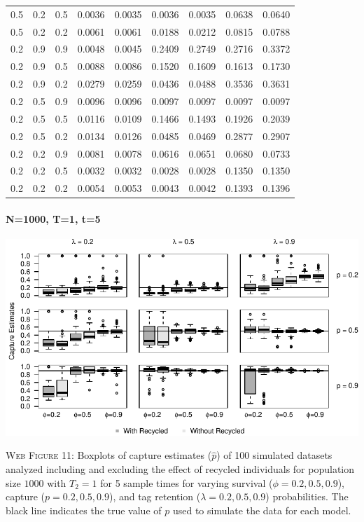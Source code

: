 \documentclass[]{article}
\let\oldparagraph\paragraph
\renewcommand{\paragraph}[1]{\oldparagraph{#1}\mbox{}}
\begin{document}
\begin{table}[ht]
{\begin{tabular}{rrrrrrrrr}
  0.5 & 0.2 & 0.5 & 0.0036 & 0.0035 & 0.0036 & 0.0035 & 0.0638 & 0.0640 \\ 
  0.5 & 0.2 & 0.2 & 0.0061 & 0.0061 & 0.0188 & 0.0212 & 0.0815 & 0.0788 \\ 
  0.2 & 0.9 & 0.9 & 0.0048 & 0.0045 & 0.2409 & 0.2749 & 0.2716 & 0.3372 \\ 
  0.2 & 0.9 & 0.5 & 0.0088 & 0.0086 & 0.1520 & 0.1609 & 0.1613 & 0.1730 \\ 
  0.2 & 0.9 & 0.2 & 0.0279 & 0.0259 & 0.0436 & 0.0488 & 0.3536 & 0.3631 \\ 
  0.2 & 0.5 & 0.9 & 0.0096 & 0.0096 & 0.0097 & 0.0097 & 0.0097 & 0.0097 \\ 
  0.2 & 0.5 & 0.5 & 0.0116 & 0.0109 & 0.1466 & 0.1493 & 0.1926 & 0.2039 \\ 
  0.2 & 0.5 & 0.2 & 0.0134 & 0.0126 & 0.0485 & 0.0469 & 0.2877 & 0.2907 \\ 
  0.2 & 0.2 & 0.9 & 0.0081 & 0.0078 & 0.0616 & 0.0651 & 0.0680 & 0.0733 \\ 
  0.2 & 0.2 & 0.5 & 0.0032 & 0.0032 & 0.0028 & 0.0028 & 0.1350 & 0.1350 \\ 
  0.2 & 0.2 & 0.2 & 0.0054 & 0.0053 & 0.0043 & 0.0042 & 0.1393 & 0.1396 \\ 
   \hline
\end{tabular}
}
\endgroup
\end{table}

\newpage

\paragraph{N=1000, T=1, t=5}\label{n1000-t1-t5-1}

\includegraphics{Appendix_BW_files/figure-latex/figure11_capture_GJSTL5-1.pdf}

\textsc{Web Figure 11:} Boxplots of capture estimates (\(\hat{p}\)) of
100 simulated datasets analyzed including and excluding the effect of recycled
individuals for population size \(1000\) with \(T_2=1\) for 5 sample times for varying survival (\(\phi=0.2,0.5,0.9\)), capture
(\(p=0.2,0.5,0.9\)), and tag retention (\(\lambda=0.2,0.5,0.9\))
probabilities. The black line indicates the true value of \(p\) used to
simulate the data for each model.
\end{document}
